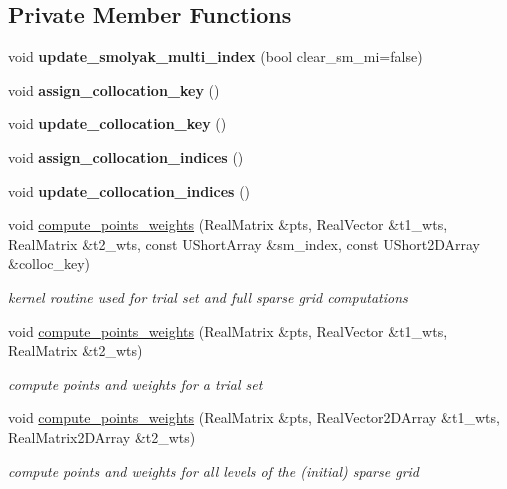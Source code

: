 \subsection*{Private Member Functions}
\begin{DoxyCompactItemize}
\item 
void {\bfseries update\+\_\+smolyak\+\_\+multi\+\_\+index} (bool clear\+\_\+sm\+\_\+mi=false)\label{classPecos_1_1HierarchSparseGridDriver_a548500f3592c3016a5c9f9158116dd45}

\item 
void {\bfseries assign\+\_\+collocation\+\_\+key} ()\label{classPecos_1_1HierarchSparseGridDriver_a9d17415950cab71229a9e2968121ff22}

\item 
void {\bfseries update\+\_\+collocation\+\_\+key} ()\label{classPecos_1_1HierarchSparseGridDriver_aa0afe77dc7d6ec1b1335b59429701e52}

\item 
void {\bfseries assign\+\_\+collocation\+\_\+indices} ()\label{classPecos_1_1HierarchSparseGridDriver_ad9e72cee34135fb982921365ccd615cd}

\item 
void {\bfseries update\+\_\+collocation\+\_\+indices} ()\label{classPecos_1_1HierarchSparseGridDriver_a280d7a1ff687e24bc8d27bc926ee11da}

\item 
void \hyperlink{classPecos_1_1HierarchSparseGridDriver_a09ad9a025482d9417274ed0a19afca8e}{compute\+\_\+points\+\_\+weights} (Real\+Matrix \&pts, Real\+Vector \&t1\+\_\+wts, Real\+Matrix \&t2\+\_\+wts, const U\+Short\+Array \&sm\+\_\+index, const U\+Short2\+D\+Array \&colloc\+\_\+key)\label{classPecos_1_1HierarchSparseGridDriver_a09ad9a025482d9417274ed0a19afca8e}

\begin{DoxyCompactList}\small\item\em kernel routine used for trial set and full sparse grid computations \end{DoxyCompactList}\item 
void \hyperlink{classPecos_1_1HierarchSparseGridDriver_aa034123d6d3477efb156ba1c8add03a9}{compute\+\_\+points\+\_\+weights} (Real\+Matrix \&pts, Real\+Vector \&t1\+\_\+wts, Real\+Matrix \&t2\+\_\+wts)\label{classPecos_1_1HierarchSparseGridDriver_aa034123d6d3477efb156ba1c8add03a9}

\begin{DoxyCompactList}\small\item\em compute points and weights for a trial set \end{DoxyCompactList}\item 
void \hyperlink{classPecos_1_1HierarchSparseGridDriver_a32c1b2db7b05e83d49b266876e9773ff}{compute\+\_\+points\+\_\+weights} (Real\+Matrix \&pts, Real\+Vector2\+D\+Array \&t1\+\_\+wts, Real\+Matrix2\+D\+Array \&t2\+\_\+wts)
\begin{DoxyCompactList}\small\item\em compute points and weights for all levels of the (initial) sparse grid \end{DoxyCompactList}\end{DoxyCompactItemize}
